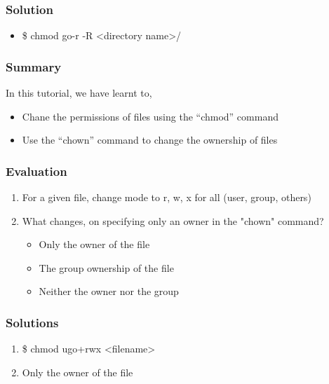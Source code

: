 \documentclass[17pt,compress]{beamer}
\begin{document}
\begin{frame}
  \frametitle{Solution}
  \begin{itemize}
  \item \$ chmod go-r -R <directory name>/
  \end{itemize}
\end{frame}

\begin{frame}
\frametitle{Summary}

  In this tutorial, we have learnt to,

\begin{itemize}
\item Chane the permissions of files using the ``chmod'' command
\item Use the ``chown'' command to change the ownership of files
\end{itemize}
\end{frame}

\begin{frame}[fragile]
\frametitle{Evaluation}
\label{sec-9}


\begin{enumerate}
\item For a given file, change mode to r, w, x for all (user, group, others)
\vspace{10pt}
\item What changes, on specifying only an owner in the "chown" command?
\begin{itemize}
\item Only the owner of the file
\item The group ownership of the file
\item Neither the owner nor the group
\end{itemize}
\end{enumerate}
\end{frame}
\begin{frame}
\frametitle{Solutions}
\label{sec-10}


\begin{enumerate}
\item \$ chmod ugo+rwx <filename>
\vspace{15pt}
\item Only the owner of the file
\end{enumerate}
\end{frame}
\end{document}
